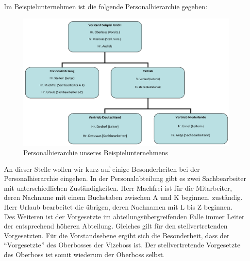 Im Beispielunternehmen ist die folgende Personalhierarchie gegeben:
\begin{figure}[H]
\centering
\includegraphics[width=1.0\linewidth]{Bilder/Hierarchie}
\caption[]{Personalhierarchie unseres Beispielunternehmens\footnotemark}
\label{fig:Hierarchie}
\end{figure}

An dieser Stelle wollen wir kurz auf einige Besonderheiten bei der Personalhierarchie eingehen. In der Personalabteilung gibt es zwei Sachbearbeiter mit unterschiedlichen Zuständigkeiten. Herr Machfrei ist für die Mitarbeiter, deren Nachname mit einem Buchstaben zwischen A und K beginnen, zuständig. Herr Urlaub bearbeitet die übrigen, deren Nachnamen mit L bis Z beginnen.\\
Des Weiteren ist der Vorgesetzte im abteilungsübergreifenden Falle immer Leiter der entsprechend höheren Abteilung. Gleiches gilt für den stellvertretenden Vorgesetzten. Für die Vorstandsebene ergibt sich die Besonderheit, dass der "`Vorgesetzte"' des Oberbosses der Vizeboss ist. Der stellvertretende Vorgesetzte des Oberboss ist somit wiederum der Oberboss selbst.


